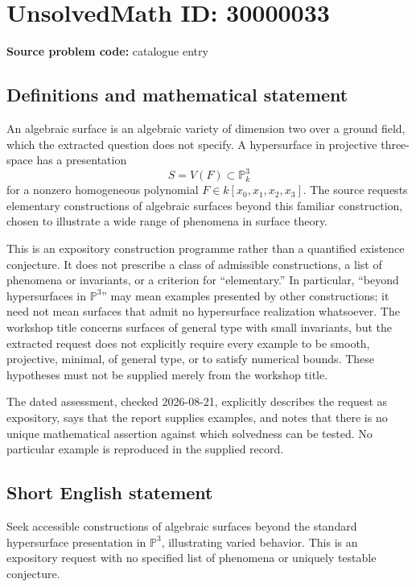 \documentclass[11pt]{article}
\newcommand{\PP}{\mathbb{P}}
\begin{document}
\section*{UnsolvedMath ID: 30000033}
\textbf{Source problem code:} catalogue entry
\subsection{Definitions and mathematical statement}
An algebraic surface is an algebraic variety of dimension two over a ground field, which the extracted question does not specify. A hypersurface in projective three-space has a presentation
\[
S=V(F)\subset\PP^3_k
\]
for a nonzero homogeneous polynomial \(F\in k[x_0,x_1,x_2,x_3]\). The source requests elementary constructions of algebraic surfaces beyond this familiar construction, chosen to illustrate a wide range of phenomena in surface theory.

This is an expository construction programme rather than a quantified existence conjecture. It does not prescribe a class of admissible constructions, a list of phenomena or invariants, or a criterion for ``elementary.'' In particular, ``beyond hypersurfaces in \(\PP^3\)'' may mean examples presented by other constructions; it need not mean surfaces that admit no hypersurface realization whatsoever. The workshop title concerns surfaces of general type with small invariants, but the extracted request does not explicitly require every example to be smooth, projective, minimal, of general type, or to satisfy numerical bounds. These hypotheses must not be supplied merely from the workshop title.

The dated assessment, checked 2026-08-21, explicitly describes the request as expository, says that the report supplies examples, and notes that there is no unique mathematical assertion against which solvedness can be tested. No particular example is reproduced in the supplied record.
\subsection{Short English statement}
Seek accessible constructions of algebraic surfaces beyond the standard hypersurface presentation in \(\PP^3\), illustrating varied behavior. This is an expository request with no specified list of phenomena or uniquely testable conjecture.
\end{document}
